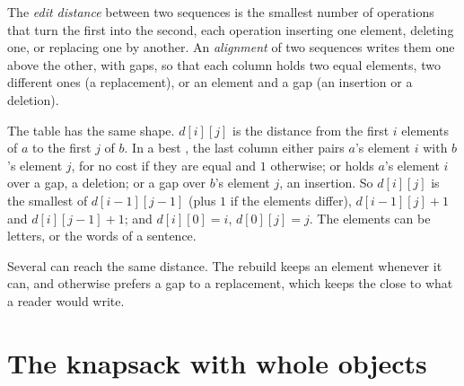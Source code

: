 \begin{definition}\label{def:g12:dynamic-programming:edit-distance}
The \emph{edit distance} between two sequences is the smallest number of operations that turn the
first into the second, each operation inserting one element, deleting one, or replacing one by another. An
\emph{alignment} of two sequences writes them one above the other, with gaps, so that each column
holds two equal elements, two different ones (a replacement), or an element and a gap (an insertion or a deletion).
\end{definition}

The table has the same shape. $d[i][j]$ is the distance from the first $i$ elements of $a$ to the first $j$ of $b$. In
a best , the last column either pairs $a$'s element $i$ with $b$'s element $j$, for no cost if they are equal
and $1$ otherwise; or holds $a$'s element $i$ over a gap, a deletion; or a gap over $b$'s element $j$, an insertion.
So $d[i][j]$ is the smallest of $d[i - 1][j - 1]$ (plus $1$ if the elements differ), $d[i - 1][j] + 1$ and
$d[i][j - 1] + 1$; and $d[i][0] = i$, $d[0][j] = j$. The elements can be letters, or the words of a sentence.

\label{lst:g12:dynamic-programming:align}

\label{lst:g12:dynamic-programming:align-show}

\label{out:g12:dynamic-programming:align}

Several  can reach the same distance. The rebuild keeps an element whenever it can, and otherwise prefers a
gap to a replacement, which keeps the  close to what a reader would write.

\section{The knapsack with whole objects}\label{sec:g12:dynamic-programming:knapsack}

